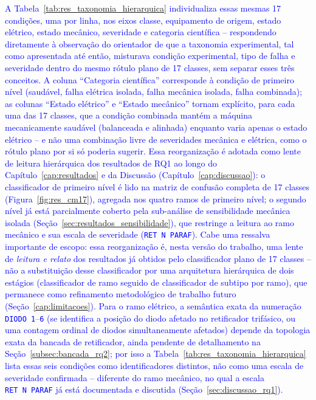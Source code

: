 \documentclass[times,final]{elsarticle}
\begin{document}
\textcolor{blue}{A Tabela~\ref{tab:res_taxonomia_hierarquica} individualiza essas mesmas 17 condições, uma por linha, nos eixos classe, equipamento de origem, estado elétrico, estado mecânico, severidade e categoria científica -- respondendo diretamente à observação do orientador de que a taxonomia experimental, tal como apresentada até então, misturava condição experimental, tipo de falha e severidade dentro do mesmo rótulo plano de 17 classes, sem separar esses três conceitos. A coluna ``Categoria científica'' corresponde à condição de primeiro nível (saudável, falha elétrica isolada, falha mecânica isolada, falha combinada); as colunas ``Estado elétrico'' e ``Estado mecânico'' tornam explícito, para cada uma das 17 classes, que a condição combinada mantém a máquina mecanicamente saudável (balanceada e alinhada) enquanto varia apenas o estado elétrico -- e não uma combinação livre de severidades mecânica e elétrica, como o rótulo plano por si só poderia sugerir. Essa reorganização é adotada como lente de leitura hierárquica dos resultados de RQ1 ao longo do Capítulo~\ref{cap:resultados} e da Discussão (Capítulo~\ref{cap:discussao}): o classificador de primeiro nível é lido na matriz de confusão completa de 17 classes (Figura~\ref{fig:res_cm17}), agregada nos quatro ramos de primeiro nível; o segundo nível já está parcialmente coberto pela sub-análise de sensibilidade mecânica isolada (Seção~\ref{sec:resultados_sensibilidade}), que restringe a leitura ao ramo mecânico e sua escala de severidade (\texttt{RET~N~PARAF}). Cabe uma ressalva importante de escopo: essa reorganização é, nesta versão do trabalho, uma lente de \emph{leitura e relato} dos resultados já obtidos pelo classificador plano de 17 classes -- não a substituição desse classificador por uma arquitetura hierárquica de dois estágios (classificador de ramo seguido de classificador de subtipo por ramo), que permanece como refinamento metodológico de trabalho futuro (Seção~\ref{cap:limitacoes}). Para o ramo elétrico, a semântica exata da numeração \texttt{DIODO~1}--\texttt{6} (se identifica a posição do diodo afetado no retificador trifásico, ou uma contagem ordinal de diodos simultaneamente afetados) depende da topologia exata da bancada de retificador, ainda pendente de detalhamento na Seção~\ref{subsec:bancada_rq2}; por isso a Tabela~\ref{tab:res_taxonomia_hierarquica} lista essas seis condições como identificadores distintos, não como uma escala de severidade confirmada -- diferente do ramo mecânico, no qual a escala \texttt{RET~N~PARAF} já está documentada e discutida (Seção~\ref{sec:discussao_rq1}).}
\end{document}

